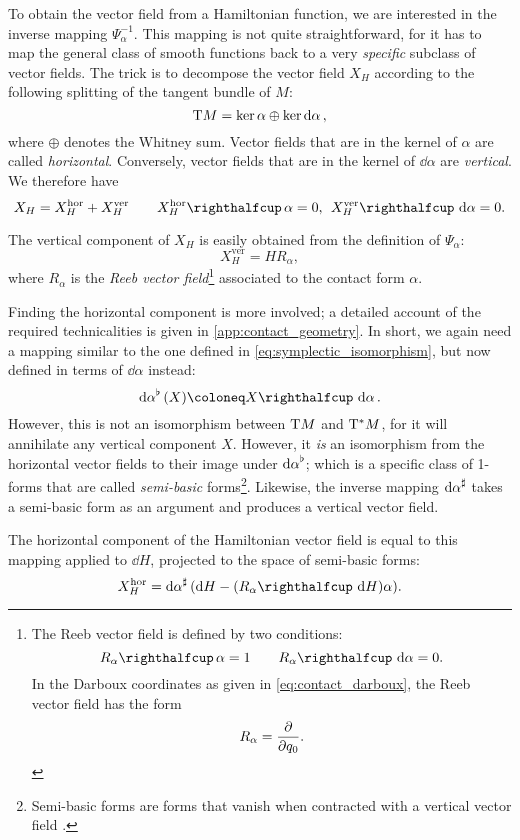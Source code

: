 To obtain the vector field from a Hamiltonian function, we are interested in the inverse mapping $\Psi^{-1}_\alpha$. This mapping is not quite straightforward, for it has to map the general class of smooth functions back to a very \emph{specific} subclass of vector fields. The trick is to decompose the vector field $X_H$ according to the following splitting of the tangent bundle of $M$:
$$ \mathrm{T}M = \ker \alpha \oplus \ker \dd{\alpha}, $$
where $\oplus$ denotes the Whitney sum. Vector fields that are in the kernel of $\alpha$ are called \emph{horizontal}. Conversely, vector fields that are in the kernel of $\dd{\alpha}$ are \emph{vertical}. We therefore have 
$$ X_H = X_H^\text{hor} + X_H^\text{ver} \qquad \intpr{X_H^\text{hor}}{\alpha} = 0,\:\: \intpr{X_H^\text{ver}}{\dd{\alpha}} = 0. $$

The vertical component of $X_H$ is easily obtained from the definition of $\Psi_\alpha$:
\begin{equation}
    X_H^\text{ver} = H R_\alpha,
    \label{eq:vertical_vf}
\end{equation}
where $R_\alpha$ is the \emph{Reeb vector field}\footnote{
    The Reeb vector field is defined by two conditions: \cite{Libermann1987}
        $$ \intpr{R_\alpha}{\alpha} = 1 \qquad \intpr{R_\alpha}{\dd{\alpha}} = 0.$$
    In the Darboux coordinates as given in \cref{eq:contact_darboux}, the Reeb vector field has the form
        $$ R_\alpha = \pdv{}{q_0}. $$} 
associated to the contact form $\alpha$.

Finding the horizontal component is more involved; a detailed account of the required technicalities is given in \cref{app:contact_geometry}. In short, we again need a mapping similar to the one defined in \cref{eq:symplectic_isomorphism}, but now defined in terms of $\dd{\alpha}$ instead:
$$ \toDual{\dd{\alpha}}(X) \coloneq \intpr{X}{\dd{\alpha}}. $$
However, this is not an isomorphism between $\mathrm{T}M$ and $\mathrm{T}^*M$, for it will annihilate any vertical component $X$. However, it \emph{is} an isomorphism from the horizontal vector fields to their image under $\dd{\alpha}^\flat$; which is a specific class of 1-forms that are called \emph{semi-basic} forms\footnote
{
    Semi-basic forms are forms that vanish when contracted with a vertical vector field \cite{Libermann1987}. 
}. 
Likewise, the inverse mapping $\dd{\alpha}^\sharp$ takes a semi-basic form as an argument and produces a vertical vector field. 

The horizontal component of the Hamiltonian vector field is equal to this mapping applied to $\dd{H}$, projected to the space of semi-basic forms:
\begin{equation}
    X_H^\text{hor} = \fromDual{\dd{\alpha}}\qty(\dd{H} - (\intpr{R_\alpha}{\dd{H}})\alpha).
    \label{eq:horizontal_vf}
\end{equation}

